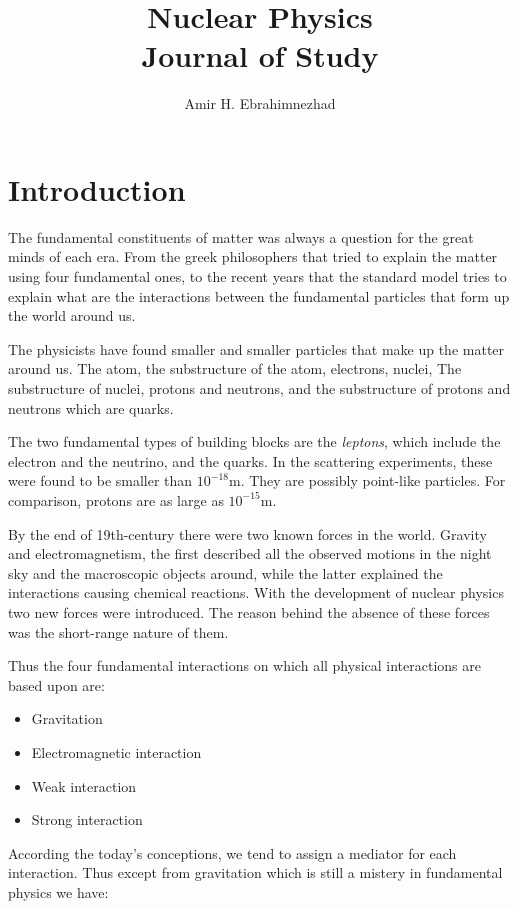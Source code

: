 \documentclass[10pt,a4paper]{article}
\title{Nuclear Physics \\ \large Journal of Study}
\author{Amir H. Ebrahimnezhad}
\begin{document}
    \maketitle

\newpage
\tableofcontents
\newpage
\section{Introduction}
The fundamental constituents of matter was always a question for the great minds of each era. From the greek philosophers that tried to explain the matter using four fundamental ones, to the recent years that the standard model tries to explain what are the interactions between the fundamental particles that form up the world around us.

The physicists have found smaller and smaller particles that make up the matter around us. The atom, the substructure of the atom, electrons, nuclei, The substructure of nuclei, protons and neutrons, and the substructure of protons and neutrons which are quarks. 

The two fundamental types of building blocks are the \textit{leptons}, which include the electron and the neutrino, and the quarks. In the scattering experiments, these were found to be smaller than $10^{-18}$m. They are possibly point-like particles.  For comparison, protons are as large as $10^{-15}$m. 

By the end of 19th-century there were two known forces in the world. Gravity and electromagnetism, the first described all the observed motions in the night sky and the macroscopic objects around, while the latter explained the interactions causing chemical reactions. With the development of nuclear physics two new forces were introduced. The reason behind the absence of these forces was the short-range nature of them.

Thus the four fundamental interactions on which all physical interactions are based upon are:
\begin{itemize}
     \item Gravitation
     \item Electromagnetic interaction
     \item Weak interaction
     \item Strong interaction
\end{itemize}

According the today's conceptions, we tend to assign a mediator for each interaction. Thus except from gravitation which is still a mistery in fundamental physics we have:
\end{document}
